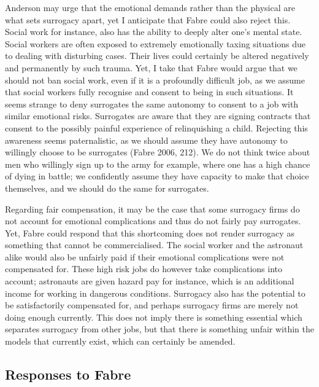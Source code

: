 Anderson may urge that the emotional demands rather than the physical
are what sets surrogacy apart, yet I anticipate that Fabre could also
reject this. Social work for instance, also has the ability to deeply
alter one's mental state. Social workers are often exposed to extremely
emotionally taxing situations due to dealing with disturbing cases.
Their lives could certainly be altered negatively and permanently by
such trauma. Yet, I take that Fabre would argue that we should not ban
social work, even if it is a profoundly difficult job, as we assume that
social workers fully recognise and consent to being in such situations.
It seems strange to deny surrogates the same autonomy to consent to a
job with similar emotional risks. Surrogates are aware that they are
signing contracts that consent to the possibly painful experience of
relinquishing a child. Rejecting this awareness seems paternalistic, as
we should assume they have autonomy to willingly choose to be
surrogates (Fabre 2006, 212). We do not think twice about men who willingly
sign up to the army for example, where one has a high chance of dying in
battle; we confidently assume they have capacity to make that choice
themselves, and we should do the same for surrogates.

Regarding fair
compensation, it may be the case that some surrogacy firms do not
account for emotional complications and thus do not fairly pay
surrogates. Yet, Fabre could respond that this shortcoming does not
render surrogacy as something that cannot be commercialised. The social
worker and the astronaut alike would also be unfairly paid if their
emotional complications were not compensated for. These high risk jobs
do however take complications into account; astronauts are given hazard
pay for instance, which is an additional income for working in dangerous
conditions. Surrogacy also has the potential to be satisfactorily
compensated for, and perhaps surrogacy firms are merely not doing enough
currently. This does not imply there is something essential which
separates surrogacy from other jobs, but that there is something unfair
within the models that currently exist, which can certainly be amended.

\subsection{Responses to Fabre}


